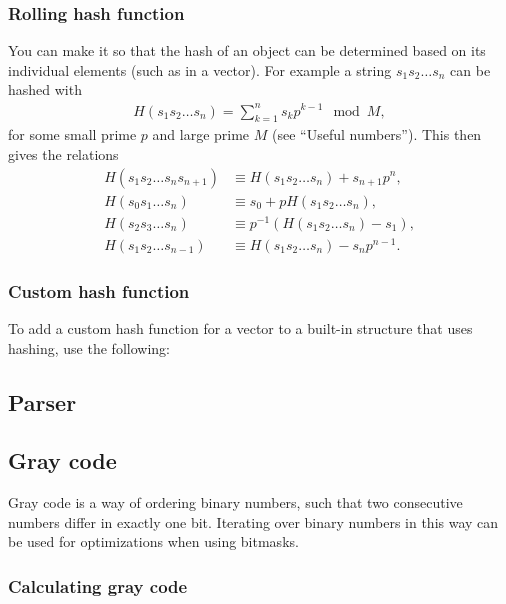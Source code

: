 \subsubsection{Rolling hash function}
You can make it so that the hash of an object can be determined based on its individual elements (such as in a vector). For example a string $s_1s_2\dots s_n$ can be hashed with
\begin{align*}
    H(s_1s_2\dots s_n) = \sum_{k=1}^n s_kp^{k-1}\mod M,
\end{align*}
for some small prime $p$ and large prime $M$ (see ``Useful numbers''). This then gives the relations
\begin{align*}
    H(s_1s_2\dots s_ns_{n+1}) &\equiv H(s_1s_2\dots s_n) + s_{n+1}p^{n}, \\
    H(s_0s_1\dots s_n) &\equiv s_0 + pH(s_1s_2\dots s_n), \\
    H(s_2s_3\dots s_n) &\equiv p^{-1}\left(H(s_1s_2\dots s_n) - s_1\right), \\
    H(s_1s_2 \dots s_{n-1}) &\equiv H(s_1s_2\dots s_n) - s_{n}p^{n - 1}.
\end{align*}

\subsubsection{Custom hash function}
To add a custom hash function for a vector to a built-in structure that uses hashing, use the following:



\subsection{Parser}




\subsection{Gray code}
Gray code is a way of ordering binary numbers, such that two consecutive numbers differ in exactly one bit. Iterating over binary numbers in this way can be used for optimizations when using bitmasks.

\subsubsection{Calculating gray code}

